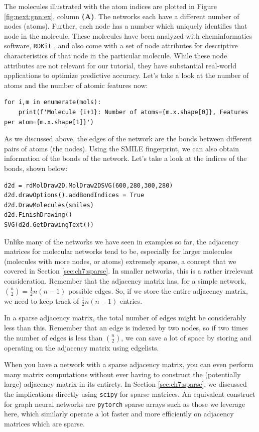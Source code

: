The molecules illustrated with the atom indices are plotted in Figure \ref{fig:next:gnn:ex}, column \textbf{(A)}. The networks each have a different number of nodes (atoms). Further, each node has a number which uniquely identifies that node in the molecule. These molecules have been analyzed with cheminformatics software, \texttt{RDKit} \cite{rdkit}, and also come with a set of node attributes for descriptive characteristics of that node in the particular molecule. While these node attributes are not relevant for our tutorial, they have substantial real-world applications to optimize predictive accuracy. Let's take a look at the number of atoms and the number of atomic features now:

\begin{lstlisting}[style=python]
for i,m in enumerate(mols):
    print(f'Molecule {i+1}: Number of atoms={m.x.shape[0]}, Features per atom={m.x.shape[1]}')
\end{lstlisting}

As we discussed above, the edges of the network are the bonds between different pairs of atoms (the nodes). Using the SMILE fingerprint, we can also obtain information of the bonds of the network. Let's take a look at the indices of the bonds, shown below:

\begin{lstlisting}[style=python]
d2d = rdMolDraw2D.MolDraw2DSVG(600,280,300,280)
d2d.drawOptions().addBondIndices = True
d2d.DrawMolecules(smiles)
d2d.FinishDrawing()
SVG(d2d.GetDrawingText())
\end{lstlisting}

Unlike many of the networks we have seen in examples so far, the adjacency matrices for molecular networks tend to be, especially for larger molecules (molecules with more nodes, or atoms) extremely sparse, a concept that we covered in Section \ref{sec:ch7:sparse}. In smaller networks, this is a rather irrelevant consideration. Remember that the adjacency matrix has, for a simple network, $\binom n 2 = \frac{1}{2}n(n - 1)$ possible edges. So, if we store the entire adjacency matrix, we need to keep track of $\frac{1}{2}n (n - 1)$ entries. 

In a sparse adjacency matrix, the total number of edges might be considerably less than this. Remember that an edge is indexed by two nodes, so if two times the number of edges is less than $\binom n 2$, we can save a lot of space by storing and operating on the adjacency matrix using edgelists.

When you have a network with a sparse adjacency matrix, you can even perform many matrix computations without ever having to construct the (potentially large) adjacency matrix in its entirety. In Section \ref{sec:ch7:sparse}, we discussed the implications directly using \texttt{scipy} for sparse matrices. An equivalent construct for graph neural networks are \texttt{pytorch} sparse arrays such as those we leverage here, which similarly operate a lot faster and more efficiently on adjacency matrices which are sparse.

